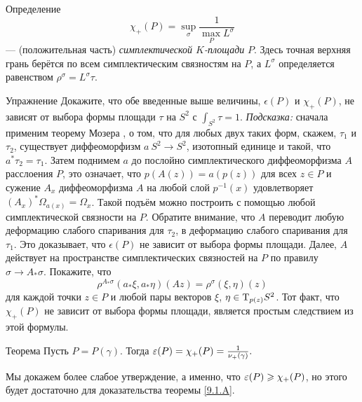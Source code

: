 \begin{ex*}{Определение}
\[\chi_+ (P) = \sup_\sigma \frac1{\max_P L^\sigma}\]  --- (положительная часть) \emph{симплектической $K$-площади} $P$.
Здесь точная верхняя грань берётся по всем симплектическим связностям на $P$, а $L^\sigma$ определяется равенством $\rho^\sigma = L^\sigma \tau$.
\end{ex*}

\begin{ex*}{Упражнение}
Докажите, что обе введенные выше величины, $\epsilon(P)$ и $\chi_+
(P)$, не зависят от выбора формы площади $\tau$ на $S^2$ с $\int_{S^2}
\tau = 1$. 
\emph{Подсказка:} сначала применим теорему Мозера \cite{MS}, о том, что для
любых двух таких форм, скажем, $\tau_1$ и $\tau_2$, существует
диффеоморфизм $a\:S^2\to S^2$, изотопный единице и такой, что $a^\ast
\tau_2 = \tau_1$.
Затем поднимем $a$ до послойно симплектического диффеоморфизма $A$
расслоения $P$, это означает, что $p(A(z)) = a(p(z))$ для всех $z \in
P$ и сужение $A_x$ диффеоморфизма $A$ на любой слой $p^{-1} (x)$
удовлетворяет $(A_x)^\ast \Omega_{a(x)} = \Omega_x$.
Такой подъём можно построить с помощью любой симплектической связности
на $P$. 
Обратите внимание, что $A$ переводит любую деформацию слабого
спаривания для $\tau_2$, в деформацию слабого спаривания для
$\tau_1$.
Это доказывает, что $\epsilon(P)$ не зависит от выбора формы площади.
Далее, $A$ действует на пространстве симплектических связностей на $P$
по правилу $\sigma \to A_\ast \sigma$.
Покажите, что 
\[\rho^{A_\ast \sigma} (a_\ast \xi, a_\ast \eta)(Az) = \rho^\sigma (\xi, \eta)(z)\]
для каждой точки $z \in P$ и любой пары векторов $\xi$, $\eta \in
\mathrm{T}_{p(z)} S^2$.
Тот факт, что $\chi_+(P)$ не зависит от выбора формы площади, является
простым следствием из этой формулы.
\end{ex*}

\begin{thm}[(\cite{P4})]{Теорема}\label{9.3.B}
  Пусть $P = P(\gamma)$.
  Тогда $\epsilon(P) = \chi_+ (P) \z= \frac1{\nu_+(\gamma)}.$
\end{thm}

Мы докажем более слабое утверждение, а именно, что $\epsilon(P) \z\ge
\chi_+ (P)$, но этого будет достаточно для доказательства теоремы
\ref{9.1.A}.

